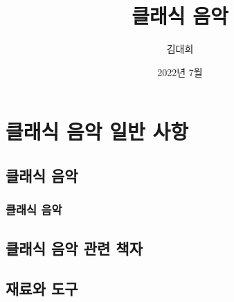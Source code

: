 \documentclass[12pt, a4paper, oneside]{book}
\begin{document}
	
			\dominitoc
			

			\title{클래식 음악}
			\author{김대희}
			\date{2022년 7월}
			\maketitle


			\tableofcontents
			\listoffigures
			\listoftables

			



		\part{클래식 음악 일반 사항}

	\newpage
	\chapter{클래식 음악}


		\newpage
		\minitoc				%


	\newpage  \null
	\section{클래식 음악}









	\newpage
	\chapter{클래식 음악 관련 책자}




	\newpage
	\chapter{재료와 도구}
\end{document}

